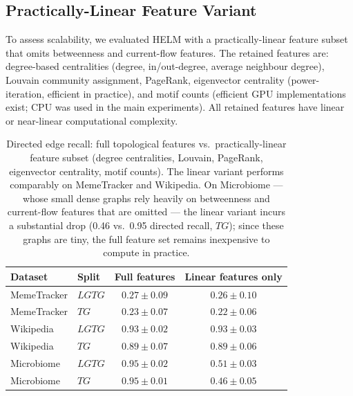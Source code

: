 \documentclass{article}
\begin{document}
    \subsection{Practically-Linear Feature Variant}
    \label{app:linear-features}

    To assess scalability, we evaluated HELM with a practically-linear feature subset that omits betweenness and current-flow features. The retained features are: degree-based centralities (degree, in/out-degree, average neighbour degree), Louvain community assignment, PageRank, eigenvector centrality (power-iteration, efficient in practice), and motif counts (efficient GPU implementations exist; CPU was used in the main experiments). All retained features have linear or near-linear computational complexity.

    \begin{table}[h]
        \centering
        \small
        \begin{tabular}{llcc}
            \toprule
            \textbf{Dataset} & \textbf{Split} & \textbf{Full features} & \textbf{Linear features only} \\
            \midrule
            MemeTracker & $LGTG$ & $0.27 \pm 0.09$ & $0.26\pm0.10$ \\
            MemeTracker & $TG$   & $0.23 \pm 0.07$ & $0.22\pm0.06$ \\
            Wikipedia   & $LGTG$ & $0.93 \pm 0.02$ & $0.93\pm0.03$ \\
            Wikipedia   & $TG$   & $0.89 \pm 0.07$ & $0.89\pm0.06$ \\
            Microbiome  & $LGTG$ & $0.95 \pm 0.02$ & $0.51\pm0.03$ \\
            Microbiome  & $TG$   & $0.95 \pm 0.01$ & $0.46\pm0.05$ \\
            \bottomrule
        \end{tabular}
        \caption{Directed edge recall: full topological features vs.\ practically-linear feature subset (degree centralities, Louvain, PageRank, eigenvector centrality, motif counts). The linear variant performs comparably on MemeTracker and Wikipedia. On Microbiome --- whose small dense graphs rely heavily on betweenness and current-flow features that are omitted --- the linear variant incurs a substantial drop (0.46 vs.\ 0.95 directed recall, $TG$); since these graphs are tiny, the full feature set remains inexpensive to compute in practice.}
        \label{tab:linear_features}
    \end{table}
\end{document}
